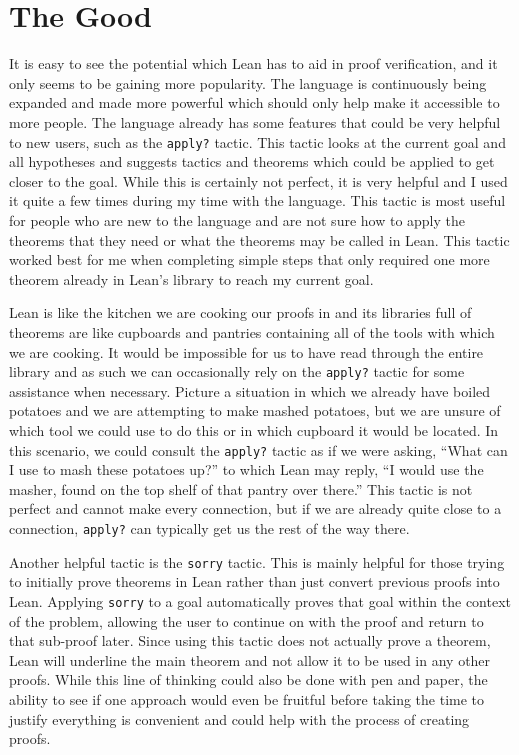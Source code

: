 \documentclass[
  letterpaper,
]{scrreprt}
\theoremstyle{remark}
\begin{document}
\hypertarget{the-good}{%
\section{The Good}\label{the-good}}

It is easy to see the potential which Lean has to aid in proof
verification, and it only seems to be gaining more popularity. The
language is continuously being expanded and made more powerful which
should only help make it accessible to more people. The language already
has some features that could be very helpful to new users, such as the
\texttt{apply?} tactic. This tactic looks at the current goal and all
hypotheses and suggests tactics and theorems which could be applied to
get closer to the goal. While this is certainly not perfect, it is very
helpful and I used it quite a few times during my time with the
language. This tactic is most useful for people who are new to the
language and are not sure how to apply the theorems that they need or
what the theorems may be called in Lean. This tactic worked best for me
when completing simple steps that only required one more theorem already
in Lean's library to reach my current goal.

Lean is like the kitchen we are cooking our proofs in and its libraries
full of theorems are like cupboards and pantries containing all of the
tools with which we are cooking. It would be impossible for us to have
read through the entire library and as such we can occasionally rely on
the \texttt{apply?} tactic for some assistance when necessary. Picture a
situation in which we already have boiled potatoes and we are attempting
to make mashed potatoes, but we are unsure of which tool we could use to
do this or in which cupboard it would be located. In this scenario, we
could consult the \texttt{apply?} tactic as if we were asking, ``What
can I use to mash these potatoes up?'' to which Lean may reply, ``I
would use the masher, found on the top shelf of that pantry over
there.'' This tactic is not perfect and cannot make every connection,
but if we are already quite close to a connection, \texttt{apply?} can
typically get us the rest of the way there.

Another helpful tactic is the \texttt{sorry} tactic. This is mainly
helpful for those trying to initially prove theorems in Lean rather than
just convert previous proofs into Lean. Applying \texttt{sorry} to a
goal automatically proves that goal within the context of the problem,
allowing the user to continue on with the proof and return to that
sub-proof later. Since using this tactic does not actually prove a
theorem, Lean will underline the main theorem and not allow it to be
used in any other proofs. While this line of thinking could also be done
with pen and paper, the ability to see if one approach would even be
fruitful before taking the time to justify everything is convenient and
could help with the process of creating proofs.
\end{document}
